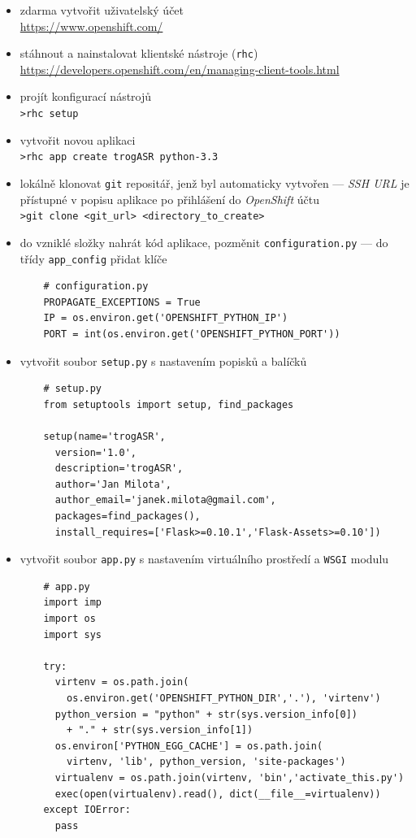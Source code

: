 \begin{itemize}
\item zdarma vytvořit uživatelský účet \\ \url{https://www.openshift.com/}
\item stáhnout a nainstalovat klientské nástroje (\verb|rhc|) \\ \url{https://developers.openshift.com/en/managing-client-tools.html}
\item projít konfigurací nástrojů \\ \verb|>rhc setup|
\item vytvořit novou aplikaci\\ \verb|>rhc app create trogASR python-3.3|
\item lokálně klonovat \verb|git| repositář, jenž byl automaticky vytvořen --- {\sl SSH URL} je přístupné v popisu aplikace po přihlášení do {\sl OpenShift} účtu
\\ \verb|>git clone <git_url> <directory_to_create>|
\item do vzniklé složky nahrát kód aplikace, pozměnit \verb|configuration.py| --- do třídy \verb|app_config| přidat klíče
	\begin{verbatim}
	# configuration.py
	PROPAGATE_EXCEPTIONS = True
	IP = os.environ.get('OPENSHIFT_PYTHON_IP')
	PORT = int(os.environ.get('OPENSHIFT_PYTHON_PORT'))
	\end{verbatim}
\item vytvořit soubor \verb|setup.py| s nastavením popisků a balíčků
	\begin{verbatim}
	# setup.py
	from setuptools import setup, find_packages

	setup(name='trogASR',
	  version='1.0',
	  description='trogASR',
	  author='Jan Milota',
	  author_email='janek.milota@gmail.com',
	  packages=find_packages(),
	  install_requires=['Flask>=0.10.1','Flask-Assets>=0.10'])
	\end{verbatim}
\item vytvořit soubor \verb|app.py| s nastavením virtuálního prostředí a \verb|WSGI| modulu
	\begin{verbatim}
	# app.py
	import imp
	import os
	import sys
	
	try:
	  virtenv = os.path.join(
	    os.environ.get('OPENSHIFT_PYTHON_DIR','.'), 'virtenv')
	  python_version = "python" + str(sys.version_info[0])
	    + "." + str(sys.version_info[1]) 
	  os.environ['PYTHON_EGG_CACHE'] = os.path.join(
	    virtenv, 'lib', python_version, 'site-packages')
	  virtualenv = os.path.join(virtenv, 'bin','activate_this.py')
	  exec(open(virtualenv).read(), dict(__file__=virtualenv))
	except IOError:
	  pass
	  

\end{verbatim}
\end{itemize}
